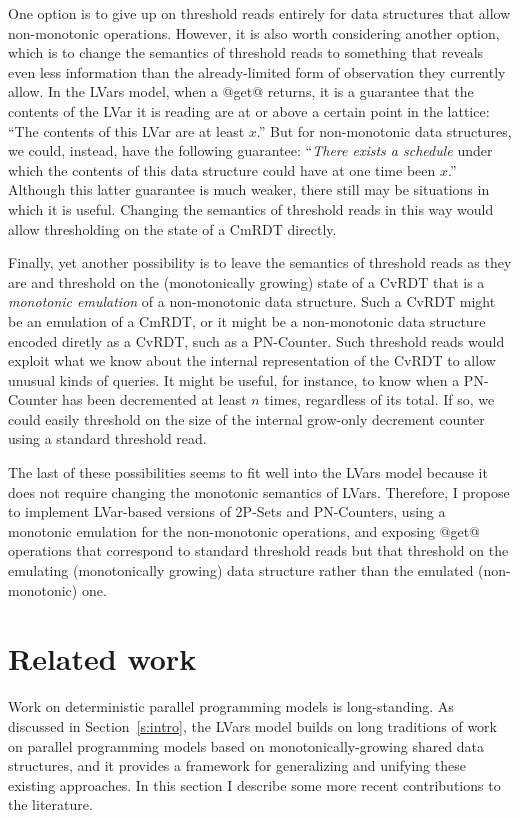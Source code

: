 \documentclass{article}
\begin{document}
One option is to give up on threshold reads entirely for data
structures that allow non-monotonic operations.  However, it is also
worth considering another option, which is to change the semantics of
threshold reads to something that reveals even less information than
the already-limited form of observation they currently allow. In the
LVars model, when a @get@ returns, it is a guarantee that the contents
of the LVar it is reading are at or above a certain point in the
lattice: ``The contents of this LVar are at least $x$.''  But for
non-monotonic data structures, we could, instead, have the following
guarantee: ``\emph{There exists a schedule} under which the contents
of this data structure could have at one time been $x$.''  Although
this latter guarantee is much weaker, there still may be situations in
which it is useful.  Changing the semantics of threshold reads in this
way would allow thresholding on the state of a CmRDT directly.

Finally, yet another possibility is to leave the semantics of
threshold reads as they are and threshold on the (monotonically
growing) state of a CvRDT that is a \emph{monotonic emulation} of a
non-monotonic data structure.  Such a CvRDT might be an emulation of a
CmRDT, or it might be a non-monotonic data structure encoded diretly
as a CvRDT, such as a PN-Counter.  Such threshold reads would exploit
what we know about the internal representation of the CvRDT to allow
unusual kinds of queries.  It might be useful, for instance, to know
when a PN-Counter has been decremented at least $n$ times, regardless
of its total.  If so, we could easily threshold on the size of the
internal grow-only decrement counter using a standard threshold read.

The last of these possibilities seems to fit well into the LVars model
because it does not require changing the monotonic semantics of LVars.
Therefore, I propose to implement LVar-based versions of 2P-Sets and
PN-Counters, using a monotonic emulation for the non-monotonic
operations, and exposing @get@ operations that correspond to standard
threshold reads but that threshold on the emulating (monotonically
growing) data structure rather than the emulated (non-monotonic) one.

\section{Related work}\label{s:related}

Work on deterministic parallel programming models is long-standing.
As discussed in Section~\ref{s:intro}, the LVars model builds on long
traditions of work on parallel programming models based on
monotonically-growing shared data structures, and it provides a
framework for generalizing and unifying these existing approaches.  In
this section I describe some more recent contributions to the
literature.
\end{document}
